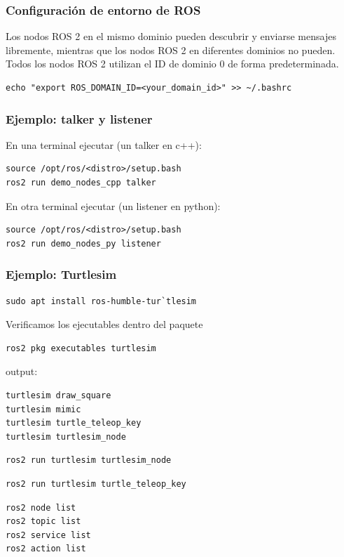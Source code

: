 \begin{frame}[fragile]
	\frametitle{Configuración de entorno de ROS}

Los nodos ROS 2 en el mismo dominio pueden descubrir y enviarse mensajes libremente, mientras que los nodos ROS 2 en diferentes dominios no pueden. Todos los nodos ROS 2 utilizan el ID de dominio 0 de forma predeterminada.

\begin{lstlisting}[style=bash]
echo "export ROS_DOMAIN_ID=<your_domain_id>" >> ~/.bashrc
\end{lstlisting}

\end{frame}


\begin{frame}[fragile]
	\frametitle{Ejemplo: talker y listener}
	
	En una terminal ejecutar (un talker en c++):
\begin{lstlisting}[style=bash]
source /opt/ros/<distro>/setup.bash
ros2 run demo_nodes_cpp talker
\end{lstlisting}

	En otra terminal ejecutar (un listener en python):
\begin{lstlisting}[style=bash]
source /opt/ros/<distro>/setup.bash
ros2 run demo_nodes_py listener
\end{lstlisting}

\end{frame}

\begin{frame}[fragile]
    \frametitle{Ejemplo: Turtlesim}
    \footnotesize
\begin{lstlisting}[style=bash]
sudo apt install ros-humble-tur`tlesim
\end{lstlisting}
    Verificamos los ejecutables dentro del paquete
\begin{lstlisting}[style=bash]
ros2 pkg executables turtlesim
\end{lstlisting}
    output:
\begin{lstlisting}[style=bash]
turtlesim draw_square
turtlesim mimic
turtlesim turtle_teleop_key
turtlesim turtlesim_node
\end{lstlisting}

\begin{lstlisting}[style=bash]
ros2 run turtlesim turtlesim_node
\end{lstlisting}

\begin{lstlisting}[style=bash]
ros2 run turtlesim turtle_teleop_key
\end{lstlisting}
\begin{lstlisting}[style=bash]
ros2 node list
ros2 topic list
ros2 service list
ros2 action list
\end{lstlisting}

\end{frame}

